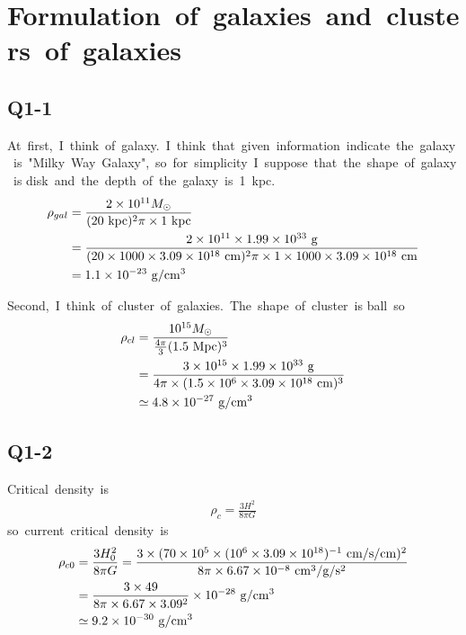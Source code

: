 \section{Formulation\ of\ galaxies\ and\ clusters\ of\ galaxies}
\subsection{Q1-1}
At\ first,\ I\ think\ of\ galaxy.\ I\ think\ that\ given\ information\ indicate\ the\ galaxy\ is\ "Milky\ Way\ Galaxy",\ so\ for\ simplicity\ I\ suppose\ that\ the\ shape\ of\ galaxy\ is disk\ and\ the\ depth\ of\ the\ galaxy\ is\ 1\ kpc.
\begin{align*}
    \rho_{gal}&=\frac{2\times10^{11}M_{\odot}}{(20\ \rm{kpc})^2\pi\times1\ \rm{kpc}}\nonumber\\
    &=\frac{2\times10^{11}\times1.99\times10^{33}\ \rm{g}}{(20\times1000\times3.09\times10^{18}\ \rm{cm})^2\pi\times1\times1000\times3.09\times10^{18}\ \rm{cm}}\nonumber\\
    &=1.1\times10^{-23}\ \rm{g/cm^3}
\end{align*}

Second,\ I\ think\ of\ cluster\ of\ galaxies.\ The\ shape\ of\ cluster\ is ball\ so
\begin{align}
    \rho_{cl}&=\frac{10^{15}M_{\odot}}{\frac{4\pi}{3}(1.5\ \rm{Mpc})^3}\nonumber\\
    &=\frac{3\times10^{15}\times1.99\times10^{33}\ \rm{g}}{4\pi\times(1.5\times10^6\times3.09\times10^{18}\ \rm{cm})^3}\nonumber\\
    &\simeq4.8\times10^{-27}\ \rm{g/cm^3}
\end{align}
\subsection{Q1-2}
Critical\ density\ is
\begin{align*}
    \rho_c=\frac{3H^2}{8\pi G}
\end{align*}
so\ current\ critical\ density\ is
\begin{align}
    \rho_{c0}&=\frac{3H_0^2}{8\pi G}=\frac{3\times(70\times10^5\times(10^6\times3.09\times10^{18})^{-1}\ \rm{cm/s/cm})^2}{8\pi\times6.67\times10^{-8}\ \rm{cm^3/g/s^2}}\nonumber\\
    &=\frac{3\times49}{8\pi\times6.67\times3.09^2}\times10^{-28}\ \rm{g/cm^3}\nonumber\\
    &\simeq9.2\times10^{-30}\ \rm{g/cm^3}
\end{align}
